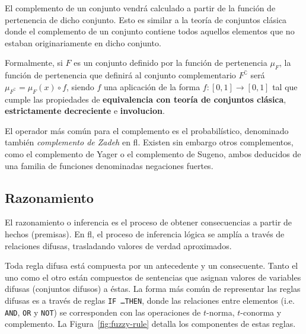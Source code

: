 El complemento de un conjunto vendrá calculado a partir de la función de pertenencia de dicho conjunto. Esto es similar a la teoría de conjuntos clásica donde el complemento de un conjunto contiene todos aquellos elementos que no estaban originariamente en dicho conjunto.

Formalmente, si $F$ es un conjunto definido por la función de pertenencia $\mu_F$, la función de pertenencia que definirá al conjunto complementario $F^\complement$ será $\mu_{F^\complement} = \mu_F(x) \circ f$, siendo $f$ una aplicación de la forma $f : [0,1] \rightarrow [0,1]$ tal que cumple las propiedades de \textbf{equivalencia con teoría de conjuntos clásica}, \textbf{estrictamente decreciente} e \textbf{involucion}.

El operador más común para el complemento es el probabilístico, denominado también \textit{complemento de Zadeh} en \ac{fl}. Existen sin embargo otros complementos, como el complemento de Yager o el complemento de Sugeno, ambos deducidos de una familia de funciones denominadas negaciones fuertes.

\subsection{Razonamiento}

El razonamiento o inferencia es el proceso de obtener consecuencias a partir de hechos (premisas). En \ac{fl}, el proceso de inferencia lógica se amplía a través de relaciones difusas, trasladando valores de verdad aproximados.

Toda regla difusa está compuesta por un antecedente y un consecuente. Tanto el uno como el otro están compuestos de sentencias que asignan valores de variables difusas (conjuntos difusos) a éstas. La forma más común de representar las reglas difusas es a través de reglas \texttt{IF \ldots THEN}, donde las relaciones entre elementos (i.e. \texttt{AND}, \texttt{OR} y \texttt{NOT}) se corresponden con las operaciones de $t$-norma, $t$-conorma y complemento. La Figura~\ref{fig:fuzzy-rule} detalla los componentes de estas reglas.

